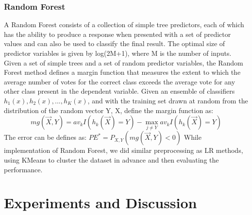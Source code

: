 \documentclass[12pt]{report}
\begin{document}
\subsubsection*{Random Forest}
A Random Forest consists of a collection of simple tree predictors, each of which has the ability to produce a response when presented with a set of predictor values and  can also be used to classify the final result. The optimal size of predictor variables is given by log(2M+1), where M is the number of inputs. 
\newline
\newline
Given a set of simple trees and a set of random predictor variables, the Random Forest method defines a margin function that measures the extent to which the average number of votes for the correct class exceeds the average vote for any other class present in the dependent variable.
Given an ensemble of classifiers $h_{1}(x), h_{2}(x),... , h_{K}(x)$, and with the training set drawn at random from the distribution of the random vector Y, X, define the margin function as:
\newline $$mg(\vec{X},Y) = av_kI(h_{k}(\vec{X})=Y) - \max \limits_{j \neq Y} av_kI(h_{k}(\vec{X})=Y)$$
\newline The error can be defines as: $PE^{*} = P_{X,Y}(mg(\vec{X},Y)<0)$
\newline
\newline
While implementation of Random Forest, we did similar preprocessing as LR methods, using KMeans to cluster the dataset in advance and then evaluating the performance.


\section*{Experiments and Discussion}
\end{document}
